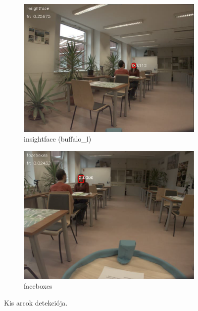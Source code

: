 \begin{figure}
    \centering
    \begin{subfigure}[b]{0.45\linewidth}
        \includegraphics[width=\linewidth]{figures/video_comparison/insightface_superiority/video_comparison_insightface_superiority_small_faces.png}
        \caption{insightface (buffalo\_l)}
    \end{subfigure}
    \begin{subfigure}[b]{0.45\linewidth}
        \includegraphics[width=\linewidth]{figures/video_comparison/insightface_superiority/video_comparison_insightface_superiority_small_faces_faceboxes.png}
        \caption{faceboxes}
    \end{subfigure}
    \caption{Kis arcok detekciója.}
    \label{fig:video_comparison_face_size}
\end{figure}

